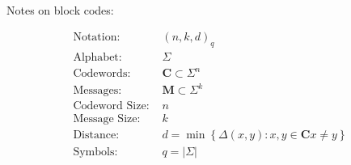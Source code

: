 \documentclass{CUNY-assignment}
\begin{document}
\[\begin{array}{rcrllrcr}
\end{array}\]%


%

Notes on block codes:

\begin{align}
\text{Notation:      }& \left( n, k, d \right)_{q}\\
\text{Alphabet:      }& \Sigma\\
\text{Codewords:     }& \mathbf{C} \subset \Sigma^{n}\\
\text{Messages:      }& \mathbf{M} \subset \Sigma^{k}\\
\text{Codeword Size: }& n \\
\text{Message  Size: }& k \\
\text{Distance:      }& d = \min\left\{ \Delta(x,y) : x,y \in \mathbf{C} x \not= y \right\}\\
\text{Symbols:       }& q = \left\lvert\Sigma\right\rvert
\end{align}
\end{document}

